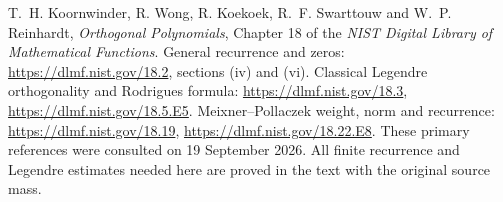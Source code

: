 T.~H. Koornwinder, R. Wong, R. Koekoek, R.~F. Swarttouw and
W.~P. Reinhardt, \emph{Orthogonal Polynomials}, Chapter 18 of the
\emph{NIST Digital Library of Mathematical Functions}.
General recurrence and zeros: \url{https://dlmf.nist.gov/18.2},
sections (iv) and (vi).
Classical Legendre orthogonality and Rodrigues formula:
\url{https://dlmf.nist.gov/18.3},
\url{https://dlmf.nist.gov/18.5.E5}.
Meixner--Pollaczek weight, norm and recurrence:
\url{https://dlmf.nist.gov/18.19},
\url{https://dlmf.nist.gov/18.22.E8}.
These primary references were consulted on 19 September 2026.
All finite recurrence and Legendre estimates needed here are
proved in the text with the original source mass.
